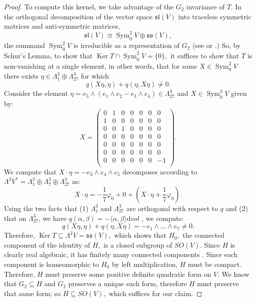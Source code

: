 \documentclass{amsart}
\theoremstyle{theorem}
\theoremstyle{definition}
\theoremstyle{definition}
\theoremstyle{definition}
\theoremstyle{theorem}
\theoremstyle{theorem}
\theoremstyle{theorem}
\theoremstyle{corollary}
\theoremstyle{question}
\theoremstyle{remark}
\DeclareMathOperator{\Ker}{Ker}
\DeclareMathOperator{\Sym}{Sym}
\begin{document}
\begin{proof}
    To compute this kernel, we take advantage of the $G_2$ invariance of $T.$ In the orthogonal decomposition of the vector space $\mathfrak{sl}(V)$ into traceless symmetric matrices and anti-symmetric matrices, $$\mathfrak{sl}(V) \cong \Sym^2_0V\oplus\mathfrak{so}(V),$$ the summand $\Sym^2_0V$ is irreducible as a representation of $G_2$ (see \cite{Bryant} or \cite[Chapter 10]{Joycebook}.) So, by Schur's Lemma, to show that $\Ker T\cap {\Sym^2_0V} = \{0\},$ it suffices to show that $T$ is non-vanishing at a single element, in other words, that for some $X\in \Sym^2_0V$ there exists $\eta\in\Lambda^3_1\oplus\Lambda^3_{27}$ for which $$q(X\eta, \eta)+q(\eta, X\eta)\neq0.$$ Consider the element $\eta = e_5\wedge(e_1\wedge e_2 - e_3\wedge e_4)\in\Lambda^3_{27}$ and $X\in \Sym^2_0V$ given by: $$X = \begin{pmatrix}0 & 1 & 0& 0& 0& 0& 0\\ 1 &0  &0 &0 &0 &0 &0 \\ 0& 0&1 &0 &0 &0 &0 \\ 0 & 0& 0& 0& 0& 0& 0\\  0&0 &0 &0 &0 &0 &0 \\0&0 &0 &0 &0 &0 &0 \\ 0&0 &0 &0 &0 &0 & -1\\\end{pmatrix}.$$ We compute that $X\cdot\eta = -e_3\wedge e_4\wedge e_5$ decomposes according to $\Lambda^3 V^* = \Lambda^3_1\oplus\Lambda^3_7\oplus\Lambda^3_{27}$ as: $$X\cdot \eta = -\frac17\varphi_0+0+\left(X\cdot \eta +\frac17\varphi_0\right).$$ Using the two facts that (1) $\Lambda^3_1$ and $\Lambda^3_{27}$ are orthogonal with respect to $q$ and (2) that on $\Lambda^3_{27}$, we have $q(\alpha, \beta)=-\langle\alpha, \beta\rangle \text{d}vol$ \cite[p. 25]{Verbitsky}, we compute: $$q(X\eta, \eta)+q(\eta, X\eta) = -e_1\wedge\dots\wedge e_7\neq 0.$$
    Therefore, $\Ker T\subseteq \Lambda^2V = \mathfrak{so}(V),$ which shows that $H_0,$ the connected component of the identity of $H,$ is a closed subgroup of $SO(V).$ Since $H$ is clearly real algebraic, it has finitely many connected components \cite[Theorem 3]{Whitney}. Since each component is homeomorphic to $H_0$ by left multiplication, $H$ must be compact. Therefore, $H$ must preserve some positive definite quadratic form on $V.$ We know that $G_2\subseteq H$ and $G_2$ preserves a unique such form, therefore $H$ must preserve that same form; so $H \subseteq SO(V),$ which suffices for our claim.


\end{proof}
\end{document}

